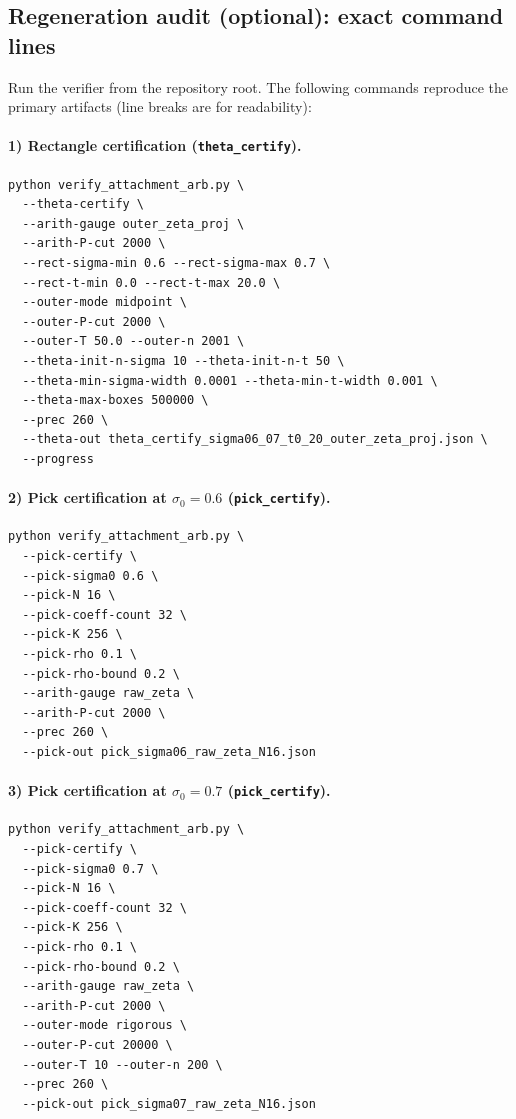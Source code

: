 \documentclass[11pt]{article}
\begin{document}
\subsection*{Regeneration audit (optional): exact command lines}
Run the verifier from the repository root.
The following commands reproduce the primary artifacts (line breaks are for readability):

\paragraph{1) Rectangle certification (\texttt{theta\_certify}).}
\begin{verbatim}
python verify_attachment_arb.py \
  --theta-certify \
  --arith-gauge outer_zeta_proj \
  --arith-P-cut 2000 \
  --rect-sigma-min 0.6 --rect-sigma-max 0.7 \
  --rect-t-min 0.0 --rect-t-max 20.0 \
  --outer-mode midpoint \
  --outer-P-cut 2000 \
  --outer-T 50.0 --outer-n 2001 \
  --theta-init-n-sigma 10 --theta-init-n-t 50 \
  --theta-min-sigma-width 0.0001 --theta-min-t-width 0.001 \
  --theta-max-boxes 500000 \
  --prec 260 \
  --theta-out theta_certify_sigma06_07_t0_20_outer_zeta_proj.json \
  --progress
\end{verbatim}

\paragraph{2) Pick certification at $\sigma_0=0.6$ (\texttt{pick\_certify}).}
\begin{verbatim}
python verify_attachment_arb.py \
  --pick-certify \
  --pick-sigma0 0.6 \
  --pick-N 16 \
  --pick-coeff-count 32 \
  --pick-K 256 \
  --pick-rho 0.1 \
  --pick-rho-bound 0.2 \
  --arith-gauge raw_zeta \
  --arith-P-cut 2000 \
  --prec 260 \
  --pick-out pick_sigma06_raw_zeta_N16.json
\end{verbatim}

\paragraph{3) Pick certification at $\sigma_0=0.7$ (\texttt{pick\_certify}).}
\begin{verbatim}
python verify_attachment_arb.py \
  --pick-certify \
  --pick-sigma0 0.7 \
  --pick-N 16 \
  --pick-coeff-count 32 \
  --pick-K 256 \
  --pick-rho 0.1 \
  --pick-rho-bound 0.2 \
  --arith-gauge raw_zeta \
  --arith-P-cut 2000 \
  --outer-mode rigorous \
  --outer-P-cut 20000 \
  --outer-T 10 --outer-n 200 \
  --prec 260 \
  --pick-out pick_sigma07_raw_zeta_N16.json
\end{verbatim}
\end{document}
